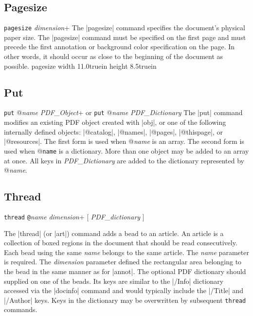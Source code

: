 {\subsection{Pagesize}
\syntax
{\tt pagesize} {\it dimension}+
\description
The |pagesize| command specifies the document's physical
paper size.  The |pagesize| command must be specified on
the first page and must precede the first annotation
or background color specification on the page.
In other words, it should occur as close to the
beginning of the document as possible.
\example
\begintt
pagesize width 11.0truein height 8.5truein
\endtt

\subsection{Put}
\syntax
\beginlist
{\tt put} @{\it name} {\it PDF\_Object}+
\endlist
or 
\beginlist
{\tt put} @{\it name} {\it PDF\_Dictionary}
\endlist
\description
The |put| command modifies an existing PDF object created with |obj|,
or one of the following internally defined objects: |@catalog|,
|@names|, |@pages|, |@thispage|, or |@resources|.
The first form is used when @{\it name} is an array.  The second
form is used when @{\tt name} is a dictionary.  More than
one object may be added to an array at once.
All keys in {\it PDF\_Dictionary}
are added to the dictionary represented by @{\it name}.
\example
\begintt
{}
\endtt

\subsection{Thread}
\syntax
{\tt thread} {\tt @}{\it name} {\it dimension}+ [ {\it PDF\_dictionary} ]

\description
The |thread| (or |art|) command adds a bead to an article.
An article is a collection of boxed regions in the document that should be
read consecutively.
Each bead using the same {\it name} belongs to the same article.
The {\it name} parameter is required.  The {\it dimension} parameter
defined the rectangular area belonging to the bead in
the same manner as for |annot|.
The optional PDF dictionary 
should supplied on one of the beads.  Its keys are
similar to the |/Info| dictionary accessed via the |docinfo| command
and would typically include the |/Title| and |/Author| keys.
Keys in the dictionary may be overwritten by subsequent {\tt thread} commands.
\example
\begintt
{}
\endtt

}
